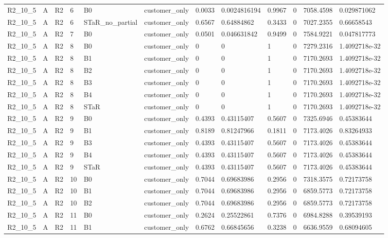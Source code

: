\begin{longtable}{llllllllllll}
R2\_10\_5 & A & R2 & 6 & B0 & customer\_only & 0.0033 & 0.0024816194 & 0.9967 & 0 & 7058.4598 & 0.029871062 \\
R2\_10\_5 & A & R2 & 6 & STaR\_no\_partial & customer\_only & 0.6567 & 0.64884862 & 0.3433 & 0 & 7027.2355 & 0.66658543 \\
R2\_10\_5 & A & R2 & 7 & B0 & customer\_only & 0.0501 & 0.046631842 & 0.9499 & 0 & 7584.9221 & 0.047817773 \\
R2\_10\_5 & A & R2 & 8 & B0 & customer\_only & 0 & 0 & 1 & 0 & 7279.2316 & 1.4092718e-32 \\
R2\_10\_5 & A & R2 & 8 & B1 & customer\_only & 0 & 0 & 1 & 0 & 7170.2693 & 1.4092718e-32 \\
R2\_10\_5 & A & R2 & 8 & B2 & customer\_only & 0 & 0 & 1 & 0 & 7170.2693 & 1.4092718e-32 \\
R2\_10\_5 & A & R2 & 8 & B3 & customer\_only & 0 & 0 & 1 & 0 & 7170.2693 & 1.4092718e-32 \\
R2\_10\_5 & A & R2 & 8 & B4 & customer\_only & 0 & 0 & 1 & 0 & 7170.2693 & 1.4092718e-32 \\
R2\_10\_5 & A & R2 & 8 & STaR & customer\_only & 0 & 0 & 1 & 0 & 7170.2693 & 1.4092718e-32 \\
R2\_10\_5 & A & R2 & 9 & B0 & customer\_only & 0.4393 & 0.43115407 & 0.5607 & 0 & 7325.6946 & 0.45383644 \\
R2\_10\_5 & A & R2 & 9 & B1 & customer\_only & 0.8189 & 0.81247966 & 0.1811 & 0 & 7173.4026 & 0.83264933 \\
R2\_10\_5 & A & R2 & 9 & B3 & customer\_only & 0.4393 & 0.43115407 & 0.5607 & 0 & 7173.4026 & 0.45383644 \\
R2\_10\_5 & A & R2 & 9 & B4 & customer\_only & 0.4393 & 0.43115407 & 0.5607 & 0 & 7173.4026 & 0.45383644 \\
R2\_10\_5 & A & R2 & 9 & STaR & customer\_only & 0.4393 & 0.43115407 & 0.5607 & 0 & 7173.4026 & 0.45383644 \\
R2\_10\_5 & A & R2 & 10 & B0 & customer\_only & 0.7044 & 0.69683986 & 0.2956 & 0 & 7318.3575 & 0.72173758 \\
R2\_10\_5 & A & R2 & 10 & B1 & customer\_only & 0.7044 & 0.69683986 & 0.2956 & 0 & 6859.5773 & 0.72173758 \\
R2\_10\_5 & A & R2 & 10 & B2 & customer\_only & 0.7044 & 0.69683986 & 0.2956 & 0 & 6859.5773 & 0.72173758 \\
R2\_10\_5 & A & R2 & 11 & B0 & customer\_only & 0.2624 & 0.25522861 & 0.7376 & 0 & 6984.8288 & 0.39539193 \\
R2\_10\_5 & A & R2 & 11 & B1 & customer\_only & 0.6762 & 0.66845656 & 0.3238 & 0 & 6636.9559 & 0.68094605 \\

\end{longtable}
